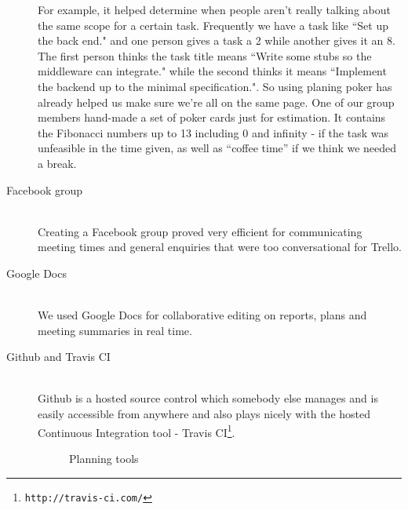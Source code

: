\documentclass[11pt, a4paper]{article}
\begin{document}
\begin{description}
For example, it helped determine when people aren't really talking about the same scope for a certain task. Frequently we have a task like ``Set up the back end." and one person gives a task a 2 while another gives it an 8. The first person thinks the task title means ``Write some stubs so the middleware can integrate." while the second thinks it means ``Implement the backend up to the minimal specification.". So using planing poker has already helped us make sure we're all on the same page. One of our group members hand-made a set of poker cards just for estimation. It contains the Fibonacci numbers up to 13 including 0 and infinity - if the task was unfeasible in the time given, as well as ``coffee time'' if we think we needed a break. 

  \item[Facebook group] \hfill \\
  Creating a Facebook group proved very efficient for communicating meeting times and general enquiries that were too conversational for Trello.  

  \item[Google Docs] \hfill \\
  We used Google Docs for collaborative editing on reports, plans and meeting summaries in real time.
  \item[Github and Travis CI] \hfill \\
  Github is a hosted source control which somebody else manages and is easily accessible from anywhere and also plays nicely with the hosted Continuous Integration tool - Travis CI\footnote{\tt{http://travis-ci.com/}}.


\begin{figure}[ht]
\centering
{}
\quad
{}
\caption{Planning tools}
\label{fig:figure}
\end{figure}

\end{description}
\end{document}
